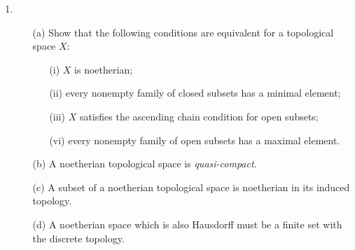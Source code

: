 \documentclass[12pt]{article}
\theoremstyle{definition}
\begin{document}
\begin{enumerate} [label=\textbf{\arabic*.}, leftmargin=-0.05em]
\begin{proof}
    Let $X$ be an irreducible topological space and let $U$ be a non-empty proper open subset of $X$. Then $C = X - U$ is a proper closed subset of $X$, so we have $X = \overline{U} \cup C$, hence $\overline{U} = X$. Conversely, if every open subset of a topological space is dense, and we have $X = C_1 \cup C_2$ for two closed subsets of $X$ with $C_1$ proper, then $U_1 = X - C_1$ is an open subset contained in $C_2$, which implies $X = \overline{U_1} \subseteq \overline{C_2} = C_2$, hence $C_2 = X$. It follows immediately that any open subset of an irreducible space is irreducible: if $V \subset U$ are open subsets, then the closure of $V$ as a subspace of $U$ is the intersection of $U$ and its closure as a subspace of $X$, and $V$ is dense in $X$, hence it is dense in $U$. Now, if $U$ is an open subset of $\overline{Y}$ for an irreducible subset $Y$ of any topological space $X$, then it must meet $Y$ by definition of the closure of a subset, then the closure of $U$ as a subspace of $X$ contains $Y$ since $U$ is dense in $Y$, hence $\overline{U} \cap \overline{Y} = \overline{Y}$.
\end{proof}

\newpage

\item
\begin{itemize}
    \item[(a)] Show that the following conditions are equivalent for a topological space $X$:
    \begin{itemize}
        \item[(i)] $X$ is noetherian;
        \item[(ii)] every nonempty family of closed subsets has a minimal element;
        \item[(iii)] $X$ satisfies the ascending chain condition for open subsets;
        \item[(vi)] every nonempty family of open subsets has a maximal element.
    \end{itemize}

    \item[(b)] A noetherian topological space is \textit{quasi-compact}.

    \item[(c)] A subset of a noetherian topological space is noetherian in its induced topology.

    \item[(d)] A noetherian space which is also Hausdorff must be a finite set with the discrete topology.
\end{itemize}


\end{enumerate}
\end{document}
